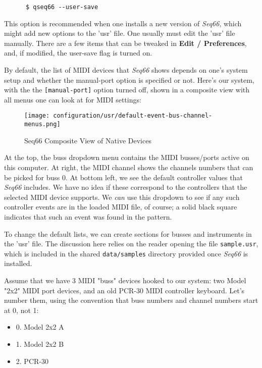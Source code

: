    \begin{verbatim}
      $ qseq66 --user-save
   \end{verbatim}

   This option is recommended when one installs a new version of
   \textsl{Seq66}, which might add new options to the 'usr' file.
   One usually must edit the 'usr' file manually.
   There are a few items that can be tweaked in \textbf{Edit / Preferences},
   and, if modified, the user-save flag is turned on.

   By default, the list of MIDI devices that \textsl{Seq66} shows depends
   on one's system setup and whether the manual-port option is specified
   or not.  Here's our system, with the
   the \texttt{[manual-port]} option turned off, shown in a
   composite view with all menus one can look at for MIDI settings:

\begin{figure}[H]
   \centering 
   \texttt{[image: configuration/usr/default-event-bus-channel-menus.png]}
   \caption{Seq66 Composite View of Native Devices}
   \label{fig:default_event_bus_channel_menus}
\end{figure}

   At the top, the buss dropdown menu contains the MIDI busses/ports
   active on this computer.  At right, the MIDI channel shows
   the channels numbers that can be picked for buss 0.  At bottom left, we see
   the default controller values that \textsl{Seq66} includes.  We have
   no idea if these correspond to the controllers that the selected MIDI device
   supports.  We \textsl{can} use this dropdown to see if any such controller
   events are in the loaded MIDI file, of course; a solid black square
   indicates that such an event was found in the pattern.

   To change the default lists, we can create sections for busses and
   instruments in the 'usr' file.
   The discussion here relies on the reader opening the file
   \texttt{sample.usr}, which is included in the shared \texttt{data/samples}
   directory provided once \textsl{Seq66} is installed.

   Assume that we have 3 MIDI "buss" devices hooked to our system:
   two Model "2x2" MIDI port devices, and an old PCR-30 MIDI controller
   keyboard.  Let's number them, using the convention that buss numbers and
   channel numbers start at 0, not 1:

   \begin{itemize}
      \item 0. Model 2x2 A
      \item 1. Model 2x2 B
      \item 2. PCR-30
   \end{itemize}

